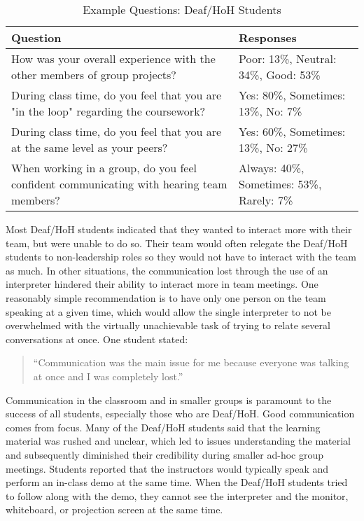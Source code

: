 \documentclass[conference]{IEEEtran}
\begin{document}
\begin{table}[h!]
\vspace{-0.05in}
\caption{Example Questions: Deaf/HoH Students}
\vspace{-0.1in}
\begin{center}
   \begin{tabular}{ p{22em} | p{10em} }

   Question  & Responses \\ \hline \hline
	How was your overall experience with the other members of group projects? & Poor: 13\%, Neutral: 34\%, Good: 53\% \\ \hline
	During class time, do you feel that you are "in the loop" regarding the coursework? & Yes: 80\%, Sometimes: 13\%, No: 7\% \\ \hline
	During class time, do you feel that you are at the same level as your peers? & Yes: 60\%, Sometimes: 13\%, No: 27\% \\ \hline
	When working in a group, do you feel confident communicating with hearing team members? & Always: 40\%, Sometimes: 53\%, Rarely: 7\% \\ \hline

    \end{tabular}
\end{center}

\label{table:deafQuestions}
\vspace{-0.1in}
\end{table}

Most Deaf/HoH students indicated that they wanted to interact more with their team, but were unable to do so. Their team would often relegate the Deaf/HoH students to non-leadership roles so they would not have to interact with the team as much. In other situations, the communication lost through the use of an interpreter hindered their ability to interact more in team meetings. One reasonably simple recommendation is to have only one person on the team speaking at a given time, which would allow the single interpreter to not be overwhelmed with the virtually unachievable task of trying to relate several conversations at once. One student stated:

\begin{quotation}
``Communication was the main issue for me because everyone was talking at once and I was completely lost.''
\end{quotation}

Communication in the classroom and in smaller groups is paramount to the success of all students, especially those who are Deaf/HoH. Good communication comes from focus. Many of the Deaf/HoH students said that the learning material was rushed and unclear, which led to issues understanding the material and subsequently diminished their credibility during smaller ad-hoc group meetings. Students reported that the instructors would typically speak and perform an in-class demo at the same time. When the Deaf/HoH students tried to follow along with the demo, they cannot see the interpreter and the monitor, whiteboard, or projection screen at the same time.
\end{document}
